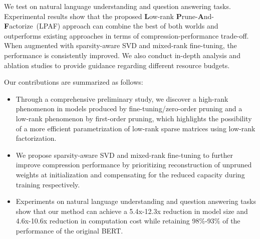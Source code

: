 We test on natural language understanding and question answering tasks. Experimental results show that the proposed \textbf{L}ow-rank  \textbf{P}rune-\textbf{A}nd-\textbf{F}actorize~(LPAF) approach can combine the best of both worlds and outperforms existing approaches in terms of compression-performance trade-off. When augmented with sparsity-aware SVD and mixed-rank fine-tuning, the performance is consistently improved. We also conduct in-depth analysis and ablation studies to provide guidance regarding different resource budgets.

Our contributions are summarized as follows:
\begin{itemize}
	\item Through a comprehensive preliminary study, we discover a high-rank phenomenon in models 
produced by fine-tuning/zero-order pruning and a low-rank phenomenon by first-order pruning, 
which highlights the possibility of a more efficient parametrization of low-rank sparse 
matrices using low-rank factorization.
	\item We propose sparsity-aware SVD and mixed-rank fine-tuning to further improve compression performance by prioritizing reconstruction of unpruned weights at initialization and compensating for the reduced capacity during training respectively.
	\item Experiments on natural language understanding and question answering tasks show that our method can achieve a 5.4x-12.3x reduction in model size and 4.6x-10.6x reduction in computation cost while retaining 98\%-93\% of the performance of the original BERT.
\end{itemize}
